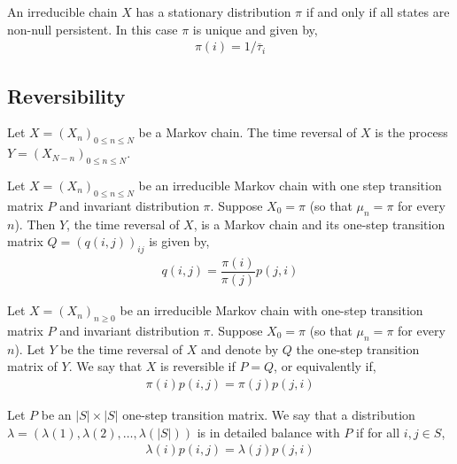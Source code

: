 \documentclass[12pt]{article}
\begin{document}
\begin{theorem}
An irreducible chain \( X \) has a stationary distribution \( \pi \) if and only if all states are non-null persistent. In this case \( \pi \) is unique and given by,
\begin{align*}
    \pi(i) = 1/\overline{\tau}_i
\end{align*}
\end{theorem}

\subsection{Reversibility}

\begin{definition}
Let \( X = (X_n)_{0\leq n\leq N} \) be a Markov chain. The time reversal of \( X \) is the process \( Y = (X_{N-n})_{0\leq n\leq N} \).
\end{definition}

\begin{theorem}
Let \( X = (X_n)_{0\leq n\leq N} \) be an irreducible Markov chain with one step transition matrix \( P \) and invariant distribution \( \pi \). Suppose \( X_0 = \pi \) (so that \( \mu_n = \pi \) for every \( n \)). Then \( Y \), the time reversal of \( X \), is a Markov chain and its one-step transition matrix \( Q = (q(i,j))_{ij} \) is given by,
\begin{align*}
    q(i,j) = \dfrac{\pi(i)}{\pi(j)} p(j,i)
\end{align*}
\end{theorem}

\begin{definition}
Let \( X = (X_n)_{n\geq 0} \) be an irreducible Markov chain with one-step transition matrix \( P \) and invariant distribution \( \pi \). Suppose \( X_0 = \pi \) (so that \( \mu_n = \pi \) for every \( n \)). Let \( Y \) be the time reversal of \( X \) and denote by \( Q \) the one-step transition matrix of \( Y \). We say that \( X \) is reversible if \( P = Q \), or equivalently if,
\begin{align*}
    \pi(i) p(i,j) = \pi(j) p(j,i)
\end{align*}
\end{definition}

\begin{definition}
Let \( P \) be an \( |S|\times |S| \) one-step transition matrix. We say that a distribution \( \lambda = (\lambda(1), \lambda(2),\ldots, \lambda(|S|)) \) is in detailed balance with \( P \) if for all \( i,j\in S \),
\begin{align*}
    \lambda(i) p(i,j) = \lambda(j) p(j,i)
\end{align*}
\end{definition}
\end{document}
